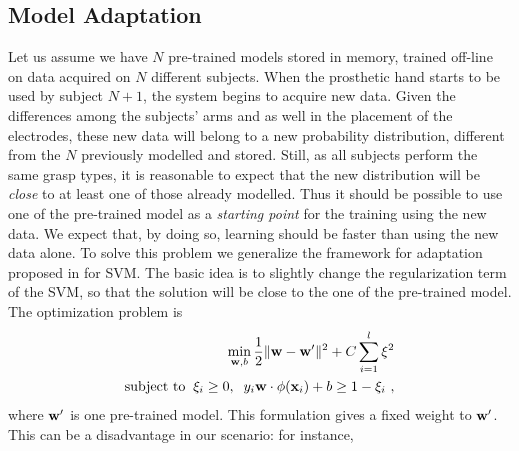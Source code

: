 \subsection{Model Adaptation}
\label{sec:adapt}

Let us assume we have $N$ pre-trained models stored in memory, trained
off-line on data acquired on $N$ different subjects. When the
prosthetic hand starts to be used by subject $N+1$, the system begins
to acquire new data. Given the differences among the subjects' arms
and as well in the placement of the electrodes, these new data will
belong to a new probability distribution, different from the $N$
previously modelled and stored. Still, as all subjects perform the
same grasp types, it is reasonable to expect that the new distribution
will be \emph{close} to at least one of those already modelled.
Thus it should be possible to use one of the pre-trained model as a
\emph{starting point} for the training using the new data.
We expect that, by doing so,  learning should be faster
than using the new data alone. 
To solve this problem we generalize the framework for adaptation proposed in
\cite{YangYH07} for SVM. 
The basic idea is to slightly change the regularization term of the
SVM, so that the solution will be close to the one of the pre-trained
model.  The optimization problem is \cite{YangYH07} %
\begin{align}
  \min_{\mathbf{w},b} \frac{1}{2} \|\mathbf{w}- \mathbf{w}'\|^2 + C \sum_{i=1}^l \xi^2 \nonumber \\
  \mbox{subject to} \;\;
  \xi_i \geq 0,\;\; y_i \mathbf{w} \cdot \phi(\mathbf{x}_i) + b \geq 1-\xi_i~,
  \label{eq:opt_prob_orig}
\end{align}
\noindent where $\mathbf{w}'$ is one pre-trained model.
This formulation gives a fixed weight to $\mathbf{w}'$. This can be a
disadvantage in our scenario: for instance,
